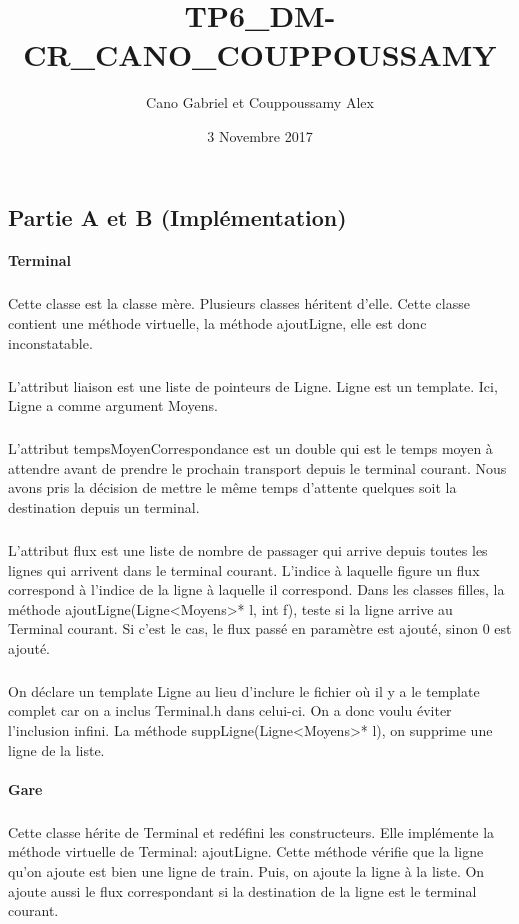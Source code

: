 \documentclass[a4paper]{article}
\title{TP6\_DM-CR\_CANO\_COUPPOUSSAMY}
\author{Cano Gabriel et Couppoussamy Alex}
\date{3 Novembre 2017}
\begin{document}
\maketitle
	\begin{justify}
	\section {Partie A et B (Implémentation)}
		\paragraph{Terminal}
		\subparagraph{}Cette classe est la classe mère. Plusieurs classes héritent d’elle. Cette classe contient une méthode virtuelle, la méthode ajoutLigne, elle est donc inconstatable.\newline
		\subparagraph{}L’attribut liaison est une liste de pointeurs de Ligne. Ligne est un template. Ici, Ligne a comme argument Moyens. \newline
		\subparagraph{}L’attribut tempsMoyenCorrespondance est un double qui est le temps moyen à attendre avant de prendre le prochain transport depuis le terminal courant. Nous avons pris la décision de mettre le même temps d’attente quelques soit la destination depuis un terminal.\newline
		\subparagraph{}L’attribut flux est une liste de nombre de passager qui arrive depuis toutes les lignes qui arrivent dans le terminal courant. L’indice à laquelle figure un flux correspond à l’indice de la ligne à laquelle il correspond. Dans les classes filles, la méthode ajoutLigne(Ligne<Moyens>* l, int f), teste si la ligne arrive au Terminal courant. Si c’est le cas, le flux passé en paramètre est ajouté, sinon 0 est ajouté.\newline
		\subparagraph{}On déclare un template Ligne au lieu d’inclure le fichier où il y a le template complet car on a inclus Terminal.h dans celui-ci. On a donc voulu éviter l’inclusion infini.\newline
La méthode suppLigne(Ligne<Moyens>* l), on supprime une ligne de la liste.
		\paragraph{Gare}
		\subparagraph{}Cette classe hérite de Terminal et redéfini les constructeurs. Elle implémente la méthode virtuelle de Terminal: ajoutLigne. Cette méthode vérifie que la ligne qu’on ajoute est bien une ligne de train. Puis, on ajoute la ligne à la liste. On ajoute aussi le flux correspondant si la destination de la ligne est le terminal courant.

\end{justify}
\end{document}
